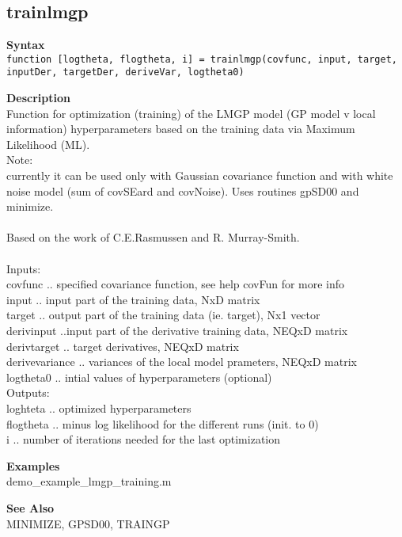 \subsection*{trainlmgp}  \label{fun:trainlmgp}


\textbf{Syntax}
\\ \texttt{function [logtheta, flogtheta, i] =
trainlmgp(covfunc, input, target, inputDer, targetDer, deriveVar,
logtheta0)}

\textbf{Description}
\\ Function for optimization (training) of the LMGP model (GP model v local
 information) hyperparameters based on the training data via
Maximum
 Likelihood (ML).
\\ Note:
\\  currently it can be used only with Gaussian covariance function
and
 with white noise model (sum of covSEard and covNoise).
 Uses routines gpSD00 and minimize.
\\
\\ Based on the work of C.E.Rasmussen and R. Murray-Smith.
\\
\\ Inputs:
\\ covfunc .. specified covariance function, see help covFun for more info
\\ input .. input part of the training data,  NxD matrix
\\ target .. output part of the training data (ie. target), Nx1 vector
\\ derivinput ..input part of the derivative training data, NEQxD matrix
\\ derivtarget .. target derivatives, NEQxD matrix
\\ derivevariance .. variances of the local model prameters, NEQxD matrix
\\ logtheta0 .. intial values of hyperparameters (optional)
\\ Outputs:
\\ loghteta .. optimized hyperparameters
\\ flogtheta .. minus log likelihood for the different runs (init. to 0)
\\ i .. number of iterations needed for the last optimization

\textbf{Examples}
\\ demo\_example\_lmgp\_training.m

\textbf{See Also}
\\ MINIMIZE, GPSD00, TRAINGP
